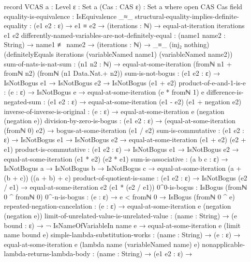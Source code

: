 \documentclass{report}
\begin{document}
\begin{code}
record VCAS {a : Level} {ε : Set a} (Cas : CAS ε) : Set a where
  open CAS Cas
  field
    equality-is-equivalence : IsEquivalence _≈_
    structural-equality-implies-definite-equality :
      (e1 e2 : ε) →
      e1 ≡ e2 →
      (iterations : ℕ) →
      equal-at-iteration iterations e1 e2
    differently-named-variables-are-not-definitely-equal :
      (name1 name2 : String) →
      name1 ≢ name2 →
      (iterations : ℕ) →
      _≡_ (inj₂ nothing)
          (definitelyEquals iterations
                            (variableNamed name1)
                            (variableNamed name2))
    sum-of-nats-is-nat-sum :
      (n1 n2 : ℕ) →
      equal-at-some-iteration (fromℕ n1 + fromℕ n2) (fromℕ (n1 Data.Nat.+ n2))
    sum-is-not-bogus :
      (e1 e2 : ε) →
      IsNotBogus e1 →
      IsNotBogus e2 →
      IsNotBogus (e1 + e2)
    product-of-e-and-1-is-e :
      (e : ε) →
      IsNotBogus e →
      equal-at-some-iteration (e * fromℕ 1) e
    difference-is-negated-sum :
      (e1 e2 : ε) →
      equal-at-some-iteration (e1 - e2)
                              (e1 + negation e2)
    inverse-of-inverse-is-original :
      (e : ε) →
      equal-at-some-iteration e (negation (negation e))
    division-by-zero-is-bogus :
      (e1 e2 : ε) →
      (equal-at-some-iteration (fromℕ 0) e2) →
      bogus-at-some-iteration (e1 / e2)
    sum-is-commutative :
      (e1 e2 : ε) →
      IsNotBogus e1 →
      IsNotBogus e2 →
      equal-at-some-iteration (e1 + e2) (e2 + e1)
    product-is-commutative :
      (e1 e2 : ε) →
      IsNotBogus e1 →
      IsNotBogus e2 →
      equal-at-some-iteration (e1 * e2) (e2 * e1)
    sum-is-associative :
      (a b c : ε) →
      IsNotBogus a →
      IsNotBogus b →
      IsNotBogus c →
      equal-at-some-iteration (a + (b + c)) ((a + b) + c)
    product-of-quotient-is-same :
      (e1 e2 : ε) →
      IsNotBogus (e2 / e1) →
      equal-at-some-iteration e2 (e1 * (e2 / e1))
    0^0-is-bogus : IsBogus (fromℕ 0 ^ fromℕ 0)
    0^-n-is-bogus : (e : ε) → e < fromℕ 0 → IsBogus (fromℕ 0 ^ e)
    repeated-negation-cancelation :
      (e : ε) → equal-at-some-iteration e (negation (negation e))
    limit-of-unrelated-value-is-unrelated-value :
      (name : String) →
      (e bound : ε) →
      ¬ IsNameOfVariableIn name e →
      equal-at-some-iteration e (limit name bound e)
    simple-lambda-substitution-works :
      (name : String) →
      (e : ε) →
      equal-at-some-iteration e (lambda name (variableNamed name) e)
    nonapplicable-lambda-returns-lambda-body :
      (name : String) →
      (e1 e2 : ε) →

\end{code}
\end{document}
